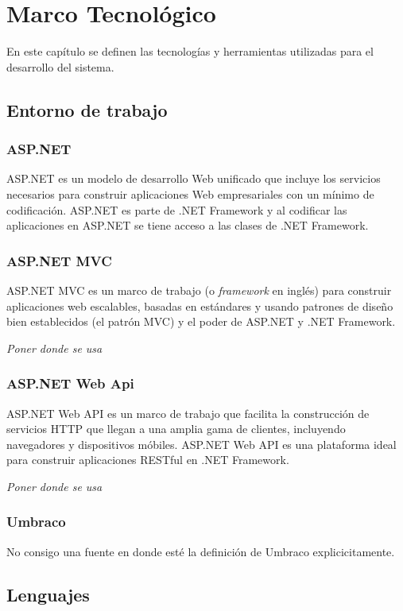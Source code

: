 \chapter{Marco Tecnológico}
En este capítulo se definen las tecnologías y herramientas utilizadas para el desarrollo del sistema.


\section{Entorno de trabajo}
\subsection{ASP.NET}
ASP.NET es un modelo de desarrollo Web unificado que incluye los servicios necesarios para construir aplicaciones Web empresariales con un mínimo de codificación. ASP.NET es parte de .NET Framework y al codificar las aplicaciones en ASP.NET se tiene acceso a las clases de .NET Framework. \cite{asp.netMicrosoft}

\subsection{ASP.NET MVC}
ASP.NET MVC es un marco de trabajo (o \textit{framework} en inglés) para construir aplicaciones web escalables, basadas en estándares y usando patrones de diseño bien establecidos (el patrón MVC) y el poder de ASP.NET y .NET Framework. \cite{asp.netMVCMicrosoft}

\emph{Poner donde se usa}

\subsection{ASP.NET Web Api}
ASP.NET Web API es un marco de trabajo que facilita la construcción de servicios HTTP que llegan a una amplia gama de clientes, incluyendo navegadores y dispositivos móbiles. ASP.NET Web API es una plataforma ideal para construir aplicaciones RESTful en .NET Framework. \cite{asp.netWebAPIMicrosoft}

\emph{Poner donde se usa}

\subsection{Umbraco}
No consigo una fuente en donde esté la definición de Umbraco explicicitamente.

\section{Lenguajes}

